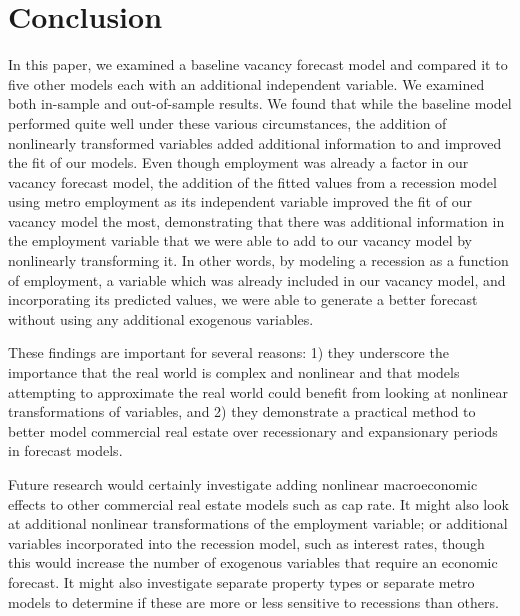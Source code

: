 \documentclass[10pt]{article}
\begin{document}
\section*{Conclusion}
In this paper, we examined a baseline vacancy forecast model and compared it to five other models each with an additional independent variable.  We examined both in-sample and out-of-sample results.  We found that while the baseline model performed quite well under these various circumstances, the addition of nonlinearly transformed variables added additional information to and improved the fit of our models.  Even though employment was already a factor in our vacancy forecast model, the addition of the fitted values from a recession model using metro employment as its independent variable improved the fit of our vacancy model the most, demonstrating that there was additional information in the employment variable that we were able to add to our vacancy model by nonlinearly transforming it.  In other words, by modeling a recession as a function of employment, a variable which was already included in our vacancy model, and incorporating its predicted values, we were able to generate a better forecast without using any additional exogenous variables.

These findings are important for several reasons: 1) they underscore the importance that the real world is complex and nonlinear and that models attempting to approximate the real world could benefit from looking at nonlinear transformations of variables, and 2) they demonstrate a practical method to better model commercial real estate over recessionary and expansionary periods in forecast models.

Future research would certainly investigate adding nonlinear macroeconomic effects to other commercial real estate models such as cap rate.  It might also look at additional nonlinear transformations of the employment variable; or additional variables incorporated into the recession model, such as interest rates, though this would increase the number of exogenous variables that require an economic forecast.  It might also investigate separate property types or separate metro models to determine if these are more or less sensitive to recessions than others.
\end{document}

